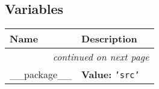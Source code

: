   \subsection{Variables}

    \vspace{-1cm}
\hspace{\varindent}\begin{longtable}{|p{\varnamewidth}|p{\vardescrwidth}|l}
\cline{1-2}
\cline{1-2} \centering \textbf{Name} & \centering \textbf{Description}& \\
\cline{1-2}
\endhead\cline{1-2}\multicolumn{3}{r}{\small\textit{continued on next page}}\\\endfoot\cline{1-2}
\endlastfoot\raggedright \_\-\_\-p\-a\-c\-k\-a\-g\-e\-\_\-\_\- & \raggedright \textbf{Value:} 
{\tt \texttt{'}\texttt{src}\texttt{'}}&\\
\cline{1-2}
\end{longtable}

